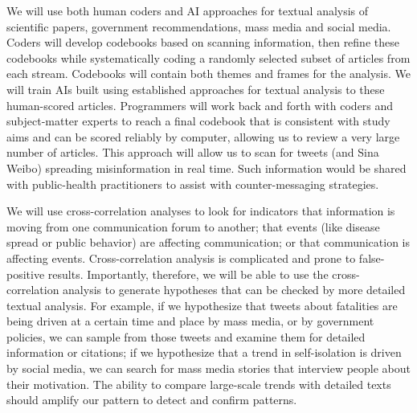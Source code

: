 

We will use both human coders and AI approaches for textual analysis of scientific papers, government recommendations, mass media and social media. Coders will develop codebooks based on scanning information, then refine these codebooks while systematically coding a randomly selected subset of articles from each stream. Codebooks will contain both themes and frames for the analysis.  We will train AIs built using established approaches for textual analysis to these human-scored articles. Programmers will work back and forth with coders and subject-matter experts to reach a final codebook that is consistent with study aims and can be scored reliably by computer, allowing us to review a very large number of articles.  
This approach will allow us to scan for tweets (and Sina Weibo) spreading misinformation in real time. Such information would be shared with public-health practitioners to assist with counter-messaging strategies.


We will use cross-correlation analyses to look for indicators that information is moving from one communication forum to another; that events (like disease spread or public behavior) are affecting communication; or that communication is affecting events. 
Cross-correlation analysis is complicated and prone to false-positive results. Importantly, therefore, we will be able to use the cross-correlation analysis to generate hypotheses that can be checked by more detailed textual analysis. For example, if we hypothesize that tweets about fatalities are being driven at a certain time and place by mass media, or by government policies, we can sample from those tweets and examine them for detailed information or citations; if we hypothesize that a trend in self-isolation is driven by social media, we can search for mass media stories that interview people about their motivation. The ability to compare large-scale trends with detailed texts should amplify our pattern to detect and confirm patterns. 


